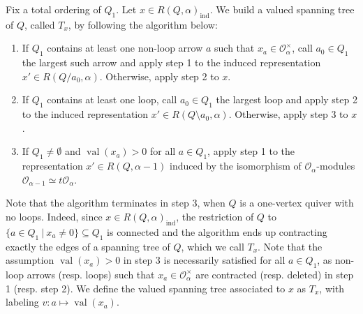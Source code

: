 \documentclass[11pt,english]{article}
\numberwithin{equation}{section}
\numberwithin{figure}{section}
\theoremstyle{definition}
\theoremstyle{plain}
\theoremstyle{remark}
\DeclareMathOperator{\val}{val}
\begin{document}
Fix a total ordering of $Q_{1}$. Let $x\in R(Q,\alpha)_{\mathrm{ind}}$.
We build a valued spanning tree of $Q$, called $T_{x}$, by following
the algorithm below:
\begin{enumerate}
\item If $Q_{1}$ contains at least one non-loop arrow $a$ such that $x_{a}\in\mathcal{O}_{\alpha}^{\times}$,
call $a_{0}\in Q_{1}$ the largest such arrow and apply step 1 to
the induced representation $x'\in R(Q/a_{0},\alpha)$. Otherwise,
apply step 2 to $x$.
\item If $Q_{1}$ contains at least one loop, call $a_{0}\in Q_{1}$ the
largest loop and apply step 2 to the induced representation $x'\in R(Q\setminus a_{0},\alpha)$.
Otherwise, apply step 3 to $x$.
\item If $Q_{1}\ne\emptyset$ and $\val(x_{a})>0$ for all $a\in Q_{1}$,
apply step 1 to the representation $x'\in R(Q,\alpha-1)$ induced
by the isomorphism of $\mathcal{O}_{\alpha}$-modules $\mathcal{O}_{\alpha-1}\simeq t\mathcal{O}_{\alpha}$.
\end{enumerate}
Note that the algorithm terminates in step 3, when $Q$ is a one-vertex
quiver with no loops. Indeed, since $x\in R(Q,\alpha)_{\mathrm{ind}}$,
the restriction of $Q$ to $\{a\in Q_{1}\ \vert\ x_{a}\ne0\}\subseteq Q_{1}$
is connected and the algorithm ends up contracting exactly the edges
of a spanning tree of $Q$, which we call $T_{x}$. Note that the
assumption $\val(x_{a})>0$ in step 3 is necessarily satisfied for
all $a\in Q_{1}$, as non-loop arrows (resp. loops) such that $x_{a}\in\mathcal{O}_{\alpha}^{\times}$
are contracted (resp. deleted) in step 1 (resp. step 2). We define
the valued spanning tree associated to $x$ as $T_{x}$, with labeling
$v:a\mapsto\val(x_{a})$.
\end{document}
